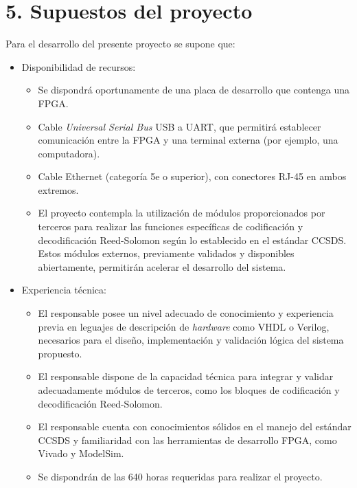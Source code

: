 \documentclass[
11pt, %
]{charter}
\begin{document}
\section{5. Supuestos del proyecto}
\label{sec:supuestos}

Para el desarrollo del presente proyecto se supone que:

\begin{itemize}
	\item Disponibilidad de recursos:
	\begin{itemize}	
		\item Se dispondrá oportunamente de una placa de desarrollo que contenga una FPGA.
		\item Cable \textit{Universal Serial Bus} USB a UART, que permitirá establecer comunicación entre la FPGA y una terminal externa (por ejemplo, una computadora).
		\item Cable Ethernet (categoría 5e o superior), con conectores RJ-45 en ambos extremos.
		\item El proyecto contempla la utilización de módulos proporcionados por terceros para realizar las funciones específicas de codificación y decodificación Reed-Solomon según lo establecido en el estándar CCSDS. Estos módulos externos, previamente validados y disponibles abiertamente, permitirán acelerar el desarrollo del sistema.
	\end{itemize}
	
	\item Experiencia técnica:
	\begin{itemize}	
		\item El responsable posee un nivel adecuado de conocimiento y experiencia previa en leguajes de descripción de \textit{hardware} como VHDL o Verilog, necesarios para el diseño, implementación y validación lógica del sistema propuesto.
		\item El responsable dispone de la capacidad técnica para integrar y validar adecuadamente módulos de terceros, como los bloques de codificación y decodificación Reed-Solomon.
		\item El responsable cuenta con conocimientos sólidos en el manejo del estándar CCSDS y familiaridad con las herramientas de desarrollo FPGA, como Vivado y ModelSim.
		\item Se dispondrán de las 640 horas requeridas para realizar el proyecto.
		
	\end{itemize}
	
	
\end{itemize}
\end{document}
